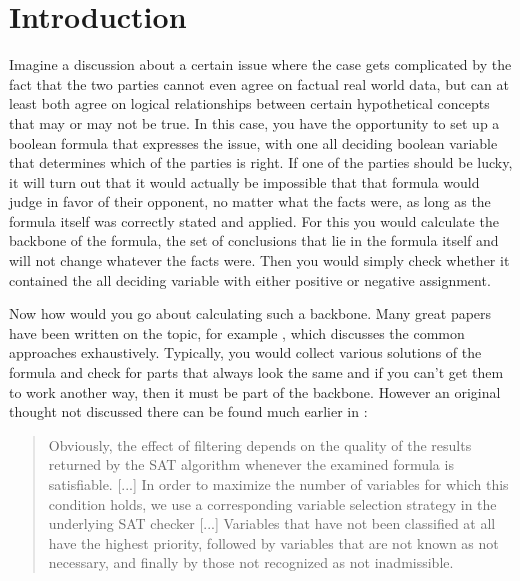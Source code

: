 \chapter{Introduction}
Imagine a discussion about a certain issue where the case gets complicated by the fact that the two parties cannot even agree on factual real world data, but can at least both agree on logical relationships between certain hypothetical concepts that may or may not be true. In this case, you have the opportunity to set up a boolean formula that expresses the issue, with one all deciding boolean variable that determines which of the parties is right. If one of the parties should be lucky, it will turn out that it would actually be impossible that that formula would judge in favor of their opponent, no matter what the facts were, as long as the formula itself was correctly stated and applied. For this you would calculate the backbone of the formula, the set of conclusions that lie in the formula itself and will not change whatever the facts were. Then you would simply check whether it contained the all deciding variable with either positive or negative assignment. 

Now how would you go about calculating such a backbone. Many great papers have been written on the topic, for example \cite{mjl15}, which discusses the common approaches exhaustively. Typically, you would collect various solutions of the formula and check for parts that always look the same and if you can't get them to work another way, then it must be part of the backbone. However an original thought not discussed there can be found much earlier in \cite{kk01}: 
\begin{quotation}
Obviously, the effect of filtering depends on the quality of the results returned by the SAT algorithm whenever the examined formula is satisfiable. [...]
In order to maximize the number of variables for which this condition holds, we use a corresponding variable selection strategy in the underlying SAT checker [...]
Variables that have not been classified at all have the highest priority, followed by variables that are not known as not necessary, and finally by those not recognized as not inadmissible.
\end{quotation}

